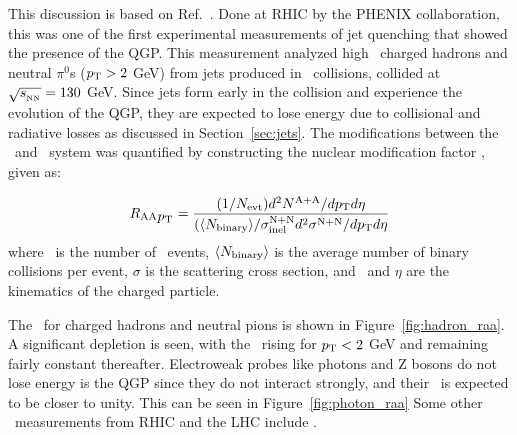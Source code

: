 

This discussion is based on Ref.~\cite{PhysRevLett.88.022301}.
Done at RHIC by the PHENIX collaboration, this was one of the first experimental measurements of jet quenching that showed the presence of the QGP.
This measurement analyzed high \pt\ charged hadrons and neutral $\pi^0$s ($\mbox{$p_{\mathrm{T}}$} > 2$ GeV) from jets produced in \AuAu\ collisions, collided at $\mbox{$\sqrt{s_{_\text{NN}}}$} = 130$ GeV.
Since jets form early in the collision and experience the evolution of the QGP, they are expected to lose energy due to collisional and radiative losses as discussed in Section~\ref{sec:jets}.
The modifications between the \pp\ and \AuAu\ system was quantified by constructing the nuclear modification factor \RAA, given as:

\begin{align}
\mbox{$R_{\rm AA}$}_{\mbox{$p_{\mathrm{T}}$}} = \frac{(1 / \mbox{$N_{\mathrm{evt}}$}) d^2 N^{\rm A+A} / d\mbox{$p_{\mathrm{T}}$} d\eta}{(\langle N_{\rm binary} \rangle / \sigma_{\rm inel}^{\rm N+N} d^2 \sigma^{\rm N+N} / d\mbox{$p_{\mathrm{T}}$} d\eta}
\end{align}
where \Nevt\ is the number of \AuAu\ events, $\langle N_{\rm binary} \rangle$ is the average number of binary collisions per event, $\sigma$ is the scattering cross section, and \pt\ and $\eta$ are the kinematics of the charged particle.

The \RAA\ for charged hadrons and neutral pions is shown in Figure~\ref{fig:hadron_raa}.
A significant depletion is seen, with the \RAA\ rising for $\mbox{$p_{\mathrm{T}}$} < 2$ GeV and remaining fairly constant thereafter.
Electroweak probes like photons and Z bosons do not lose energy is the QGP since they do not interact strongly, and their \RAA\ is expected to be closer to unity.
This can be seen in Figure~\ref{fig:photon_raa}
Some other \RAA\ measurements from RHIC and the LHC include \cite{PhysRevLett.91.172302, PhysRevLett.91.072301, PhysRevC.70.061901, 201130, Chatrchyan2012, Khachatryan:2016odn, ATLAS-CONF-2017-012}.


